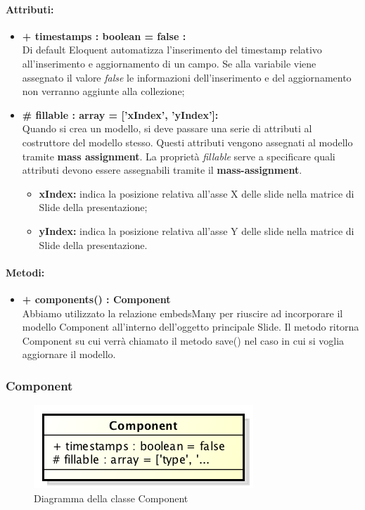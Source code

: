 	\paragraph{Attributi:}
	\begin{itemize}
		\item \textbf{+ timestamps : boolean = false :}\\
		Di default Eloquent automatizza l'inserimento del timestamp relativo all'inserimento e aggiornamento di un campo. Se alla variabile viene assegnato il valore \textit{false} le informazioni dell'inserimento e del aggiornamento non verranno aggiunte alla collezione;
		\item \textbf{\# fillable : array = [’xIndex’, ’yIndex']:}\\
		Quando si crea un modello, si deve passare una serie di attributi al costruttore del modello stesso. Questi attributi vengono assegnati al modello tramite \textbf{mass assignment}. La proprietà \textit{fillable} serve a specificare quali attributi devono essere assegnabili tramite il \textbf{mass-assignment}.
		\begin{itemize}
			\item \textbf{xIndex:} indica la posizione relativa all'asse X delle slide nella matrice di Slide della presentazione;
			\item \textbf{yIndex:} indica la posizione relativa all'asse Y delle slide nella matrice di Slide della presentazione.
		\end{itemize}
	\end{itemize}
	
	\paragraph{Metodi:}
	\begin{itemize}
		\item \textbf{+ components() : Component}\\
		Abbiamo utilizzato la relazione embedsMany per riuscire ad incorporare il modello Component all’interno dell’oggetto principale Slide. Il metodo ritorna Component su cui verrà chiamato il metodo save() nel caso in cui si voglia aggiornare il modello.
	\end{itemize}
	\newpage
	

\subsubsection{Component}

	\begin{figure}[h]
		\centering
		\includegraphics[width=0.5\linewidth]{img/back_end_premi_model_component}
		\caption[Diagramma della classe Component]{Diagramma della classe Component}
		\label{fig:back_end_premi_model_component}
	\end{figure}


